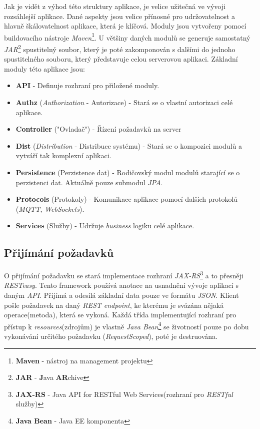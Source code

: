 Jak je vidět z výhod této struktury aplikace, je velice užitečná ve vývoji rozsáhlejší aplikace.
Dané aspekty jsou velice přínosné pro udržovatelnost a hlavně škálovatelnost aplikace, která je klíčová.
Moduly jsou vytvořeny pomocí buildovacího nástroje \emph{Maven}\footnote{\textbf{Maven} - nástroj na management projektu}.
U většiny daných modulů se generuje samostatný \emph{JAR}\footnote{\textbf{JAR} - \textbf{J}ava \textbf{AR}chive} spustitelný soubor,
který je poté zakomponován s dalšími do jednoho spustitelného souboru, který představuje celou serverovou aplikaci.
\newline
Základní moduly této aplikace jsou:
\begin{itemize}
  \item \textbf{API} - Definuje rozhraní pro přiložené moduly.
  \item \textbf{Authz} (\emph{Authorization} - Autorizace) - Stará se o vlastní autorizaci celé aplikace.
  \item \textbf{Controller} ("Ovladač") - Řízení požadavků na server
  \item \textbf{Dist} (\emph{Distribution} - Distribuce systému) - Stará se o kompozici modulů a vytváří tak komplexní aplikaci.
  \item \textbf{Persistence} (Perzistence dat) - Rodičovský modul modulů starající se o perzistenci dat. Aktuálně pouze submodul \emph{JPA}.
  \item \textbf{Protocols} (Protokoly) - Komunikace aplikace pomocí dalších protokolů (\emph{MQTT}, \emph{WebSockets}).
  \item \textbf{Services} (Služby) - Udržuje \emph{business} logiku celé aplikace.
\end{itemize}

\newpage
\subsection*{Přijímání požadavků}
\label{impl:backend:request}
O přijímání požadavku se stará implementace rozhraní \emph{JAX-RS}\footnote{\textbf{JAX-RS} - Java API for RESTful Web Services(rozhraní pro \emph{RESTful} služby)} a to přesněji \emph{RESTeasy}.
Tento framework používá anotace na usnadnění vývoje aplikací s daným \emph{API}.
Přijímá a odesílá základní data pouze ve formátu \emph{JSON}.
Klient pošle požadavek na daný \emph{REST endpoint}, ke kterému je svázána nějaká operace(metoda), která se vykoná.
Každá třída implementující rozhraní pro přístup k \emph{resources}(zdrojům) je vlastně \emph{Java Bean}\footnote{\textbf{Java Bean} - Java EE komponenta} se životností pouze po dobu vykonávání určitého požadavku (\emph{RequestScoped}), poté je destruována.

